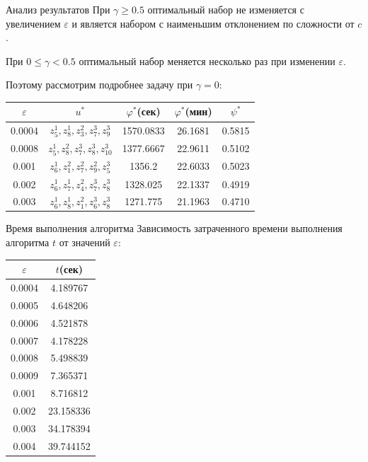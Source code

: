\documentclass[aspectratio=169]{beamer}
\begin{document}
    \begin{frame}{Анализ результатов}
        При $\gamma\geq 0.5$ оптимальный набор не изменяется с увеличением $\varepsilon$ и является набором с наименьшим отклонением по сложности от $c$.\newline
        
        При $0\leq\gamma<0.5$ оптимальный набор меняется несколько раз при изменении $\varepsilon$.\newline
        
        Поэтому рассмотрим подробнее задачу при $\gamma=0$:
        
        \begin{table}[]
\begin{tabular}{|c|c|c|c|c|}
\hline
$\varepsilon$ & $u^*$ & $\varphi^*$(сек) & $\varphi^*$(мин) & $\psi^*$ \\ \hline
0.0004 & $z_5^1,z_8^1,z_3^2,z_7^3,z_9^3$ & 1570.0833 & 26.1681 & 0.5815 \\ \hline
0.0008 & $z_5^1,z_8^2,z_7^3,z_8^3,z_{10}^3$ & 1377.6667 & 22.9611 & 0.5102 \\ \hline
0.001 & $z_6^1,z_1^2,z_7^2,z_9^2,z_5^3$ & 1356.2    & 22.6033 & 0.5023 \\ \hline
0.002 & $z_6^1,z_7^1,z_4^2,z_7^3,z_8^3$ & 1328.025  & 22.1337 & 0.4919 \\ \hline
0.003 & $z_6^1,z_8^1,z_1^2,z_6^3,z_8^3$ & 1271.775  & 21.1963 & 0.4710 \\ \hline
\end{tabular}
\end{table}
    \end{frame}
    
    \begin{frame}{Время выполнения алгоритма}
        Зависимость затраченного времени выполнения алгоритма $t$ от значений $\varepsilon$:
        \begin{table}[]
\begin{tabular}{|c|c|} \hline
$\varepsilon$ & $t$(сек) \\ \hline
0.0004 & 4.189767  \\ \hline
0.0005 & 4.648206  \\ \hline
0.0006 & 4.521878  \\ \hline
0.0007 & 4.178228  \\ \hline
0.0008 & 5.498839  \\ \hline
0.0009 & 7.365371  \\ \hline
0.001  & 8.716812  \\ \hline
0.002  & 23.158336 \\ \hline
0.003  & 34.178394 \\ \hline
0.004  & 39.744152 \\ \hline
\end{tabular}
\end{table}
    \end{frame}
    
\end{document}
